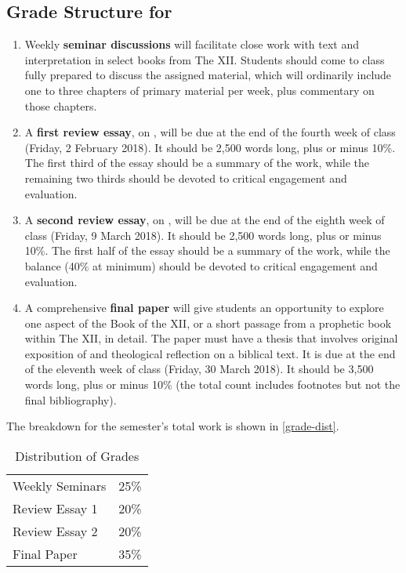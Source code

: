 \documentclass[titlepage]{article}
\newcommand\policy{../policy}
\begin{document}
\subsection{Grade Structure for \ccode}
\label{structure}

\begin{enumerate}

	\item Weekly \textbf{seminar discussions} will facilitate close work
	with text and interpretation in select books from The XII. Students
	should come to class fully prepared to discuss the assigned
	material, which will ordinarily include one to three chapters of
	primary material per week, plus commentary on those chapters.

	\item A \textbf{first review essay}, on \cite{Two}, will be due at
	the end of the fourth week of class (Friday, 2 February 2018). It
	should be 2,500 words long, plus or minus 10\%. The first third of
	the essay should be a summary of the work, while the remaining two
	thirds should be devoted to critical engagement and evaluation.

	\item A \textbf{second review essay}, on \cite{Seitz}, will be due
	at the end of the eighth week of class (Friday, 9 March 2018). It
	should be 2,500 words long, plus or minus 10\%. The first half of
	the essay should be a summary of the work, while the balance (40\%
	at minimum) should be devoted to critical engagement and evaluation.

	\item A comprehensive \textbf{final paper} will give students an
	opportunity to explore one aspect of the Book of the XII, or a short
	passage from a prophetic book within The XII, in detail. The paper
	must have a thesis that involves original exposition of and
	theological reflection on a biblical text. It is due at the end of
	the eleventh week of class (Friday, 30 March 2018). It should be
	3,500 words long, plus or minus 10\% (the total count includes
	footnotes but not the final bibliography).

\end{enumerate}

The breakdown for the semester's total work is shown in
\autoref{grade-dist}.

\begin{table}[htbp]
  \centering
  {\lining
  \begin{tabular}{lr}
    \toprule
    Weekly Seminars & 25\% \\
    Review Essay 1  & 20\% \\
    Review Essay 2  & 20\% \\
    Final Paper     & 35\% \\
    \bottomrule
  \end{tabular}}
  \caption{Distribution of Grades}
  \label{grade-dist}
\end{table}



\end{document}
